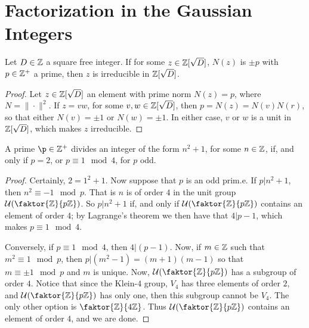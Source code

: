 \section{Factorization in the Gaussian Integers}
\label{section_6.4}

\begin{lemma}\label{lemma_6.4.1}
  Let $D \in \mathbb{Z}$ a square free integer. If for some $z \in \mathbb{Z}[\sqrt{D}]$,
  $N(z)$ is $\pm{p}$ with $p \in \mathbb{Z}^+$ a prime, then
  $z$ is irreducible in $\mathbb{Z}[\sqrt{D}]$.
\end{lemma}
\begin{proof}
  Let $z \in \mathbb{Z}[\sqrt{D}]$ an element with prime norm $N(z)=p$, where
  $N=\|\cdot\|^2$. If $z=vw$, for some  $v,w \in \mathbb{Z}[\sqrt{D}]$, then
  $p=N(z)=N(v)N(r)$, so that either $N(v)=\pm 1$ or $N(w)=\pm 1$. In either
  case, $v$ or  $w$ is a unit in  $\mathbb{Z}[\sqrt{D}]$, which makes $z$ irreducible.
\end{proof}

\begin{lemma}\label{lemma_6.4.2}
  A prime $\p \in \Z^+$ divides an integer of the form  $n^2+1$, for some  $n
  \in \mathbb{Z}$, if, and only if  $p=2$, or  $p \equiv 1 \mod{4}$, for $p$ odd.
\end{lemma}
\begin{proof}
  Certainly, $2=1^2+1$. Now suppose that  $p$ is an odd prim.e. If  $p|n^2+1$,
  then  $n^2 \equiv -1 \mod{p}$. That is $n$ is of order $4$ in the unit group
  $\Uc{(\faktor{\Z}{p\Z})}$. So $p|n^2+1$ if, and only if  $\Uc{(\faktor{\Z}{p\Z})}$
  contains an element of order $4$; by Lagrange's theorem we then have that
  $4|p-1$, which makes $p \equiv 1 \mod{4}$.

  Conversely, if $p \equiv 1 \mod{4}$, then $4|(p-1)$. Now, if $m \in \mathbb{Z}$ such
  that  $m^2 \equiv 1 \mod{p}$, then $p|(m^2-1)=(m+1)(m-1)$ so that $m \equiv
  \pm 1 \mod{p}$ and $m$ is unique. Now, $\Uc{(\faktor{\Z}{p\Z})}$ has a subgroup
  of order $4$. Notice that since the Klein-$4$ group, $V_4$ has three elements
  of order $2$, and  $\Uc{(\faktor{\Z}{p\Z})}$ has only one, then this subgroup
  cannot be $V_4$. The only other option is $\faktor{\Z}{4\Z}$. Thus
  $\Uc{(\faktor{\Z}{p\Z})}$ contains an element of order $4$, and we are done.
\end{proof}

